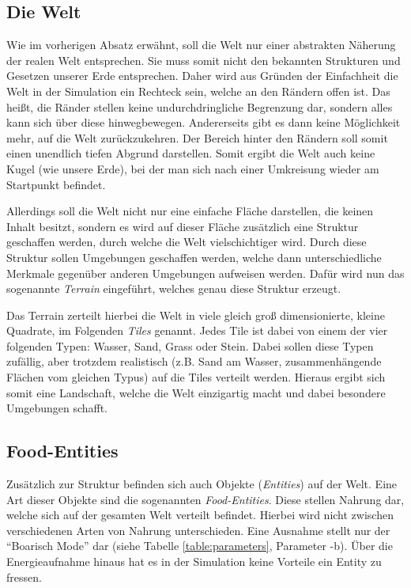 \documentclass[course=erap]{aspdoc}
\begin{document}
\subsection{Die Welt}
\label{subsec:die-welt}
Wie im vorherigen Absatz erwähnt, soll die Welt nur einer abstrakten Näherung der realen Welt entsprechen. Sie muss somit nicht den bekannten Strukturen und Gesetzen unserer Erde entsprechen. Daher wird aus Gründen der Einfachheit die Welt in der Simulation ein Rechteck sein, welche an den Rändern offen ist. Das heißt, die Ränder stellen keine undurchdringliche Begrenzung dar, sondern alles kann sich über diese hinwegbewegen. Andererseits gibt es dann keine Möglichkeit mehr, auf die Welt zurückzukehren. Der Bereich hinter den Rändern soll somit einen unendlich tiefen Abgrund darstellen. Somit ergibt die Welt auch keine Kugel (wie unsere Erde), bei der man sich nach einer Umkreisung wieder am Startpunkt befindet.

Allerdings soll die Welt nicht nur eine einfache Fläche darstellen, die keinen Inhalt besitzt, sondern es wird auf dieser Fläche zusätzlich eine Struktur geschaffen werden, durch welche die Welt vielschichtiger wird. Durch diese Struktur sollen Umgebungen geschaffen werden, welche dann unterschiedliche Merkmale gegenüber anderen Umgebungen aufweisen werden. Dafür wird nun das sogenannte \emph{Terrain} eingeführt, welches genau diese Struktur erzeugt.

Das Terrain zerteilt hierbei die Welt in viele gleich groß dimensionierte, kleine Quadrate, im Folgenden \emph{Tiles} genannt. Jedes Tile ist dabei von einem der vier folgenden Typen: Wasser, Sand, Grass oder Stein. Dabei sollen diese Typen zufällig, aber trotzdem realistisch (z.B. Sand am Wasser, zusammenhängende Flächen vom gleichen Typus) auf die Tiles verteilt werden. Hieraus ergibt sich somit eine Landschaft, welche die Welt einzigartig macht und dabei besondere Umgebungen schafft.


\subsection{Food-Entities}
Zusätzlich zur Struktur befinden sich auch Objekte (\emph{Entities}) auf der Welt. Eine Art dieser Objekte sind die sogenannten \emph{Food-Entities}. Diese stellen Nahrung dar, welche sich auf der gesamten Welt verteilt befindet. Hierbei wird nicht zwischen verschiedenen Arten von Nahrung unterschieden. Eine Ausnahme stellt nur der "`Boarisch Mode"' dar (siehe Tabelle \ref{table:parameters}, Parameter -b). Über die Energieaufnahme hinaus hat es in der Simulation keine Vorteile ein Entity zu fressen.
\end{document}
